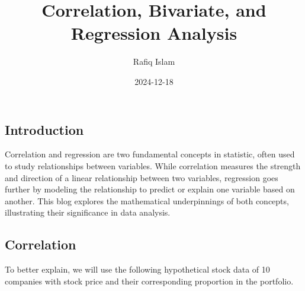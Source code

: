 \documentclass[
  letterpaper,
  DIV=11,
  numbers=noendperiod]{scrartcl}
\title{Correlation, Bivariate, and Regression Analysis}
\author{Rafiq Islam}
\date{2024-12-18}
\renewcommand*\contentsname{Table of contents}
\newcommand\contentsname{Table of contents}
\begin{document}
\maketitle

\renewcommand*\contentsname{Table of contents}
{
\hypersetup{linkcolor=}
\setcounter{tocdepth}{4}
\tableofcontents
}

\subsection{Introduction}\label{introduction}

Correlation and regression are two fundamental concepts in statistic,
often used to study relationships between variables. While correlation
measures the strength and direction of a linear relationship between two
variables, regression goes further by modeling the relationship to
predict or explain one variable based on another. This blog explores the
mathematical underpinnings of both concepts, illustrating their
significance in data analysis.

\subsection{Correlation}\label{correlation}

To better explain, we will use the following hypothetical stock data of
10 companies with stock price and their corresponding proportion in the
portfolio.
\end{document}

